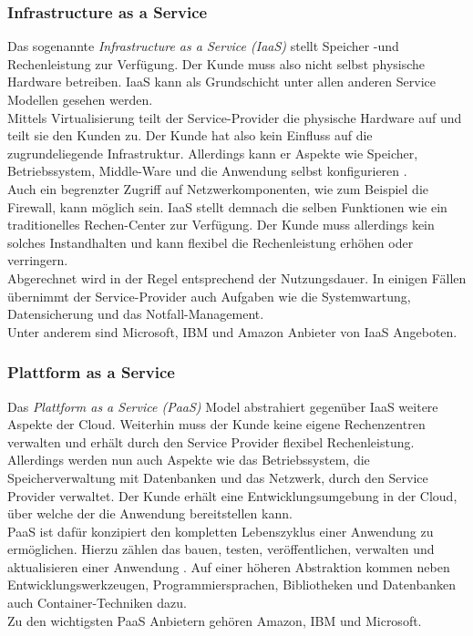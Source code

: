 \subsubsection{Infrastructure as a Service}
Das sogenannte\textit{ Infrastructure as a Service (IaaS)}\cite{mell_nist_2011} stellt Speicher -und Rechenleistung zur Verfügung. Der Kunde muss also nicht selbst physische Hardware betreiben. IaaS kann als Grundschicht unter allen anderen Service Modellen gesehen werden.\\
Mittels Virtualisierung teilt der Service-Provider die physische Hardware auf und teilt sie den Kunden zu. Der  Kunde hat also kein Einfluss auf die zugrundeliegende Infrastruktur. Allerdings kann er Aspekte wie Speicher, Betriebssystem, Middle-Ware und die Anwendung selbst konfigurieren \cite{dimpi_rani_rajiv_kumar_ranjan_comparative_2014}.\\
Auch ein begrenzter Zugriff auf Netzwerkomponenten, wie zum Beispiel die Firewall, kann möglich sein. IaaS stellt demnach die selben Funktionen wie ein traditionelles  Rechen-Center zur Verfügung. Der Kunde muss allerdings kein solches Instandhalten und kann flexibel die Rechenleistung erhöhen oder verringern. \\
Abgerechnet wird in der Regel entsprechend der Nutzungsdauer. In einigen Fällen übernimmt der Service-Provider auch Aufgaben wie die Systemwartung, Datensicherung und das Notfall-Management.\\
Unter anderem sind Microsoft, IBM und Amazon Anbieter von IaaS Angeboten. \cite{simon_lohmann_iaas_nodate} \cite{mell_nist_2011}
\subsubsection{Plattform as a Service}
Das \textit{Plattform as a Service (PaaS)}\cite{mell_nist_2011} Model abstrahiert gegenüber IaaS weitere Aspekte der Cloud. Weiterhin muss der Kunde keine eigene Rechenzentren verwalten und erhält durch den Service Provider flexibel Rechenleistung.\\
Allerdings werden nun auch Aspekte wie das Betriebssystem, die Speicherverwaltung mit Datenbanken und das Netzwerk, durch den Service Provider verwaltet. Der Kunde erhält eine Entwicklungsumgebung in der Cloud, über welche der die Anwendung bereitstellen kann. \\
PaaS ist dafür konzipiert den kompletten Lebenszyklus einer Anwendung zu ermöglichen. Hierzu zählen das bauen, testen, veröffentlichen, verwalten und aktualisieren einer Anwendung \cite{dimpi_rani_rajiv_kumar_ranjan_comparative_2014}. Auf einer höheren Abstraktion kommen neben Entwicklungswerkzeugen, Programmiersprachen, Bibliotheken und Datenbanken auch Container-Techniken dazu.\\
Zu den wichtigsten PaaS Anbietern gehören Amazon, IBM und Microsoft. \cite{simon_lohmann_platform_nodate}\cite{sowmya_layers_2014} \cite{mell_nist_2011} 
